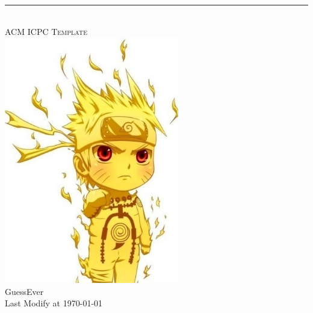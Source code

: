 \begin{center}
	\pagestyle{empty}
	\hrule
	~\\[100pt]
	\fontsize{48pt}{\baselineskip}\selectfont \textsc{ACM ICPC Template}\\[80pt]
	\includegraphics[width=3in]{./logo.jpg}
	~\\[50pt]
	\Huge GuessEver \\[20pt]
	\Large Last Modify at \today\\
	\clearpage
\end{center}
